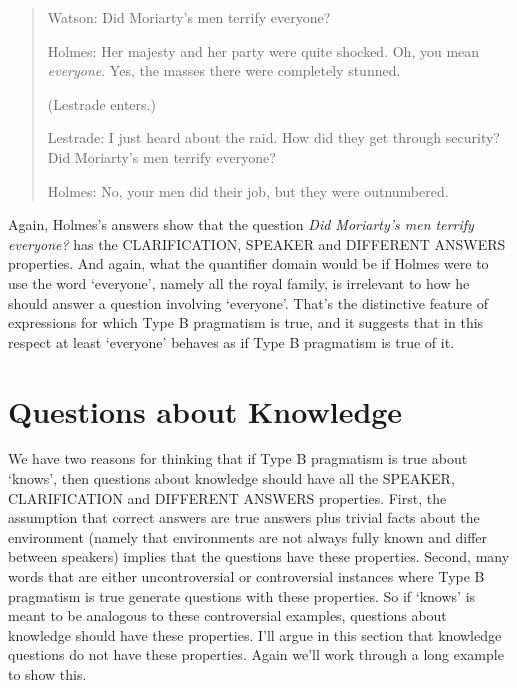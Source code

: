 \documentclass[
  10pt,
  letterpaper,
  DIV=11,
  numbers=noendperiod,
  twoside]{scrartcl}
\begin{document}
\begin{quote}
Watson: Did Moriarty's men terrify everyone?

Holmes: Her majesty and her party were quite shocked. Oh, you mean
\emph{everyone}. Yes, the masses there were completely stunned.

(Lestrade enters.)

Lestrade: I just heard about the raid. How did they get through
security? Did Moriarty's men terrify everyone?

Holmes: No, your men did their job, but they were outnumbered.
\end{quote}

Again, Holmes's answers show that the question \emph{Did Moriarty's men
terrify everyone?} has the CLARIFICATION, SPEAKER and DIFFERENT ANSWERS
properties. And again, what the quantifier domain would be if Holmes
were to use the word `everyone', namely all the royal family, is
irrelevant to how he should answer a question involving `everyone'.
That's the distinctive feature of expressions for which Type B
pragmatism is true, and it suggests that in this respect at least
`everyone' behaves as if Type B pragmatism is true of it.

\section{Questions about Knowledge}\label{questions-about-knowledge}

We have two reasons for thinking that if Type B pragmatism is true about
`knows', then questions about knowledge should have all the SPEAKER,
CLARIFICATION and DIFFERENT ANSWERS properties. First, the assumption
that correct answers are true answers plus trivial facts about the
environment (namely that environments are not always fully known and
differ between speakers) implies that the questions have these
properties. Second, many words that are either uncontroversial or
controversial instances where Type B pragmatism is true generate
questions with these properties. So if `knows' is meant to be analogous
to these controversial examples, questions about knowledge should have
these properties. I'll argue in this section that knowledge questions do
not have these properties. Again we'll work through a long example to
show this.
\end{document}
